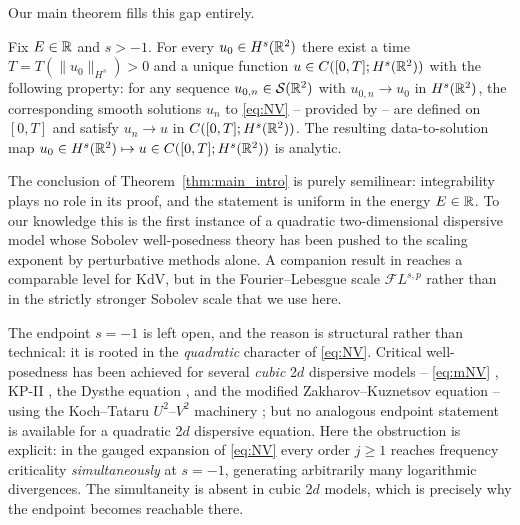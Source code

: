 \medskip

Our main theorem fills this gap entirely.

\begin{theorem}\label{thm:main_intro}
Fix $E\in\mathbb{R}$ and $s>-1$. For every $u_0\in H^s(\mathbb{R}^2)$ there exist a time $T=T(\|u_0\|_{H^s})>0$ and a unique function $u\in C([0,T];H^s(\mathbb{R}^2))$ with the following property: for any sequence $u_{0,n}\in\mathcal{S}(\mathbb{R}^2)$ with $u_{0,n}\to u_0$ in $H^s(\mathbb{R}^2)$, the corresponding smooth solutions $u_n$ to \eqref{eq:NV} -- provided by \cite{angelopolous, kazeykinamunoz1, kazeykinamunoz2} -- are defined on $[0,T]$ and satisfy $u_n\to u$ in $C([0,T];H^s(\mathbb{R}^2))$. The resulting data-to-solution map $u_0\in H^s(\mathbb{R}^2)\mapsto u\in C([0,T];H^s(\mathbb{R}^2))$ is analytic.
\end{theorem}

\begin{remark}
The conclusion of Theorem~\ref{thm:main_intro} is purely semilinear: integrability plays no role in its proof, and the statement is uniform in the energy $E\in\mathbb{R}$. To our knowledge this is the first instance of a quadratic two-dimensional dispersive model whose Sobolev well-posedness theory has been pushed to the scaling exponent by perturbative methods alone. A companion result in \cite{chcora} reaches a comparable level for KdV, but in the Fourier--Lebesgue scale $\mathcal{F}L^{s,p}$ rather than in the strictly stronger Sobolev scale that we use here.
\end{remark}

\begin{remark}
The endpoint $s=-1$ is left open, and the reason is structural rather than technical: it is rooted in the \emph{quadratic} character of \eqref{eq:NV}. Critical well-posedness has been achieved for several \emph{cubic} 2$d$ dispersive models -- \eqref{eq:mNV} \cite{Schottdorf}, KP-II \cite{HHK}, the Dysthe equation \cite{MPS_Dysthe}, and the modified Zakharov--Kuznetsov equation \cite{CorreiaKinoshita} -- using the Koch--Tataru $U^2$--$V^2$ machinery \cite{KochTataru}; but no analogous endpoint statement is available for a quadratic 2$d$ dispersive equation. Here the obstruction is explicit: in the gauged expansion of \eqref{eq:NV} every order $j\ge 1$ reaches frequency criticality \emph{simultaneously} at $s=-1$, generating arbitrarily many logarithmic divergences. The simultaneity is absent in cubic 2$d$ models, which is precisely why the endpoint becomes reachable there.
\end{remark}


